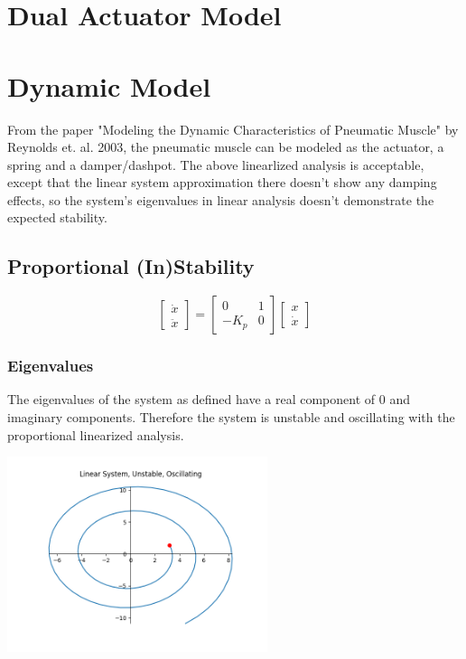 \documentclass[12pt, letterpaper, oneside, notitlepage, onecolumn]{article}
\begin{document}
\section{Dual Actuator Model}


\section{Dynamic Model}

From the paper "Modeling the Dynamic Characteristics of Pneumatic Muscle" by
Reynolds et. al. 2003, the pneumatic muscle can be modeled as the actuator, a
spring and a damper/dashpot. The above linearlized analysis is acceptable,
except that the linear system approximation there doesn't show any damping
effects, so the system's eigenvalues in linear analysis doesn't demonstrate the
expected stability.

\subsection{Proportional (In)Stability}

\begin{equation}
\begin{bmatrix}
\dot{x} \\
\ddot{x}
\end{bmatrix}
=
\begin{bmatrix}
0 & 1 \\
-K_{p} & 0
\end{bmatrix}
%
\begin{bmatrix}
x \\
\dot{x}
\end{bmatrix}
\end{equation}

\subsubsection{Eigenvalues}

The eigenvalues of the system as defined have a real component of 0 and
imaginary components. Therefore the system is unstable and oscillating with the
proportional linearized analysis.

\begin{center}
\includegraphics[width=3in,angle=0]{linear_unstable}
\end{center}
\end{document}
